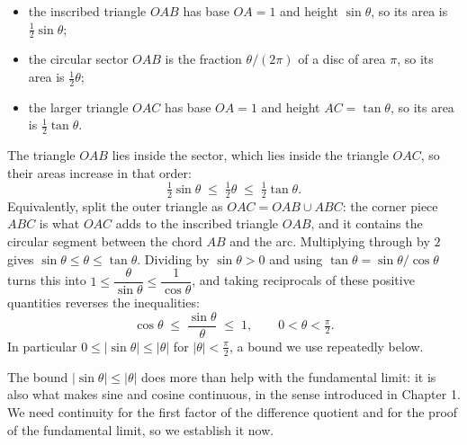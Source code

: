 \documentclass[a4paper,12pt,oneside]{memoir}
\begin{document}
\begin{itemize}
  \item the inscribed triangle \(OAB\) has base \(OA = 1\) and height \(\sin\theta\), so its area is \(\tfrac12 \sin\theta\);
  \item the circular sector \(OAB\) is the fraction \(\theta / (2\pi)\) of a disc of area \(\pi\), so its area is \(\tfrac12 \theta\);
  \item the larger triangle \(OAC\) has base \(OA = 1\) and height \(AC = \tan\theta\), so its area is \(\tfrac12 \tan\theta\).
\end{itemize}
The triangle \(OAB\) lies inside the sector, which lies inside the triangle \(OAC\), so their areas increase in that order: \[ \tfrac12 \sin\theta \;\le\; \tfrac12 \theta \;\le\; \tfrac12 \tan\theta. \] Equivalently, split the outer triangle as \(OAC = OAB \cup ABC\): the corner piece \(ABC\) is what \(OAC\) adds to the inscribed triangle \(OAB\), and it contains the circular segment between the chord \(AB\) and the arc. Multiplying through by \(2\) gives \(\sin\theta \le \theta \le \tan\theta\). Dividing by \(\sin\theta > 0\) and using \(\tan\theta = \sin\theta/\cos\theta\) turns this into \(1 \le \dfrac{\theta}{\sin\theta} \le \dfrac{1}{\cos\theta}\), and taking reciprocals of these positive quantities reverses the inequalities: \[ \cos\theta \;\le\; \frac{\sin\theta}{\theta} \;\le\; 1, \qquad 0 < \theta < \tfrac{\pi}{2}. \tag{1} \] In particular \(0 \le \lvert \sin\theta \rvert \le \lvert \theta \rvert\) for \(\lvert \theta \rvert < \tfrac{\pi}{2}\), a bound we use repeatedly below.

The bound \(\lvert \sin\theta \rvert \le \lvert \theta \rvert\) does more than help with the fundamental limit: it is also what makes sine and cosine continuous, in the sense introduced in Chapter 1. We need continuity for the first factor of the difference quotient and for the proof of the fundamental limit, so we establish it now.
\end{document}
